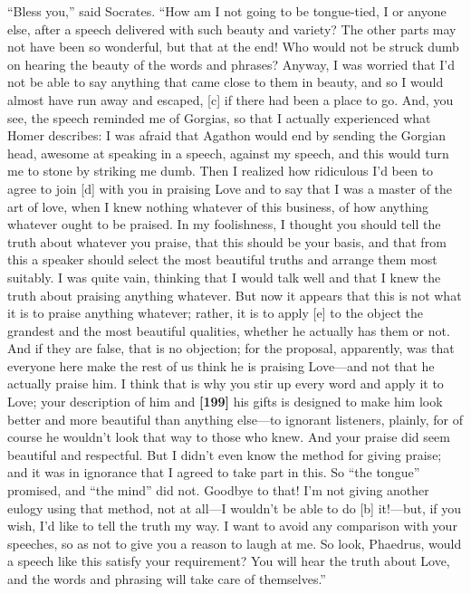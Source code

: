 “Bless you,” said Socrates. “How am I not going to be tongue-tied, I or
anyone else, after a speech delivered with such beauty and variety? The
other parts may not have been so wonderful, but that at the end! Who
would not be struck dumb on hearing the beauty of the words and phrases?
Anyway, I was worried that I'd not be able to say anything that came
close to them in beauty, and so I would almost have run away and
escaped, {[}c{]} if there had been a place to go. And, you see, the
speech reminded me of Gorgias, so that I actually experienced what Homer
describes: I was afraid that Agathon would end by sending the Gorgian
head, awesome at
speaking in a speech, against my speech, and this would turn me to stone
by striking me dumb. Then I realized how ridiculous I'd been to agree to
join {[}d{]} with you in praising Love and to say that I was a master of
the art of love, when I knew nothing whatever of this business, of how
anything whatever ought to be praised. In my foolishness, I thought you
should tell the truth about whatever you praise, that this should be
your basis, and that from this a speaker should select the most
beautiful truths and arrange them most suitably. I was quite vain,
thinking that I would talk well and that I knew the truth about praising
anything whatever. But now it appears that this is not what it is to
praise anything whatever; rather, it is to apply {[}e{]} to the object
the grandest and the most beautiful qualities, whether he actually has
them or not. And if they are false, that is no objection; for the
proposal, apparently, was that everyone here make the rest of us think
he is praising Love---and not that he actually praise him. I think that
is why you stir up every word and apply it to Love; your description of
him and {\bf {[}199{]}} his gifts is designed to make him look better
and more beautiful than anything else---to ignorant listeners, plainly,
for of course he wouldn't look that way to those who knew. And your
praise did seem beautiful and respectful. But I didn't even know the
method for giving praise; and it was in ignorance that I agreed to take
part in this. So “the tongue” promised, and “the mind” did
not. Goodbye to that!
I'm not giving another eulogy using that method, not at all---I wouldn't
be able to do {[}b{]} it!---but, if you wish, I'd like to tell the truth
my way. I want to avoid any comparison with your speeches, so as not to
give you a reason to laugh at me. So look, Phaedrus, would a speech like
this satisfy your requirement? You will hear the truth about Love, and
the words and phrasing will take care of themselves.”

